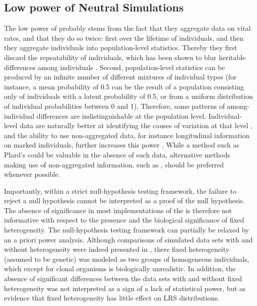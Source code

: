 \subsection{Low power of Neutral Simulations}
The low power of \NSM probably stems from the fact that they aggregate data on vital rates, and that they do so twice: first over the lifetime of individuals, and then they aggregate individuals into population-level statistics. Thereby they first discard the repeatability of individuals, which has been shown to blur heritable differences among individuals \parencite{Vaupel1988}. Second, population-level statistics can be produced by an infinite number of different mixtures of individual types (for instance, a mean probability of 0.5 can be the result of a population consisting only of individuals with a latent probability of 0.5, or from a uniform distribution of individual probabilities between 0 and 1). Therefore, some patterns of among-individual differences are indistinguishable at the population level. Individual-level data are naturally better at identifying the causes of variation at that level \parencite{Cluttonbrock2010}, and the ability to use non-aggregated data, for instance longitudinal information on marked individuals, further increases this power \parencite{Brooks2013}. While a method such as Plard's \NSM could be valuable in the absence of such data, alternative methods making use of non-aggregated information, such as \MM, should be preferred whenever possible.

Importantly, within a strict null-hypothesis testing framework, the failure to reject a null hypothesis cannot be interpreted as a proof of the null hypothesis. The absence of significance in most implementations of the \NSM \parencite{Steiner2010,Orzack2011,Tuljapurkar2009,Plard2012} is therefore not informative with respect to the presence and the biological significance of fixed heterogeneity. The null-hypothesis testing framework can partially be relaxed by an a priori power analysis. Although comparisons of simulated data sets with and without heterogeneity were indeed presented in \cite{Steiner2012}, there fixed heterogeneity (assumed to be genetic) was modeled as two groups of homogeneous individuals, which except for clonal organisms is biologically unrealistic. In addition, the absence of significant differences between the data sets with and without fixed heterogeneity was not interpreted as a sign of a lack of statistical power, but as evidence that fixed heterogeneity has little effect on LRS distributions. 

